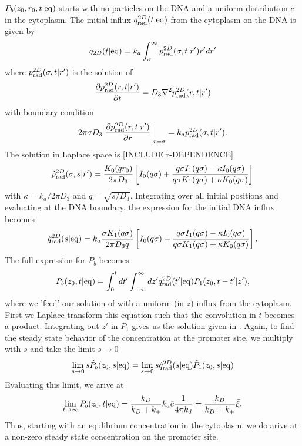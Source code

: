\documentclass[a4paper,10pt]{article}
\begin{document}
$P_b(z_0, r_0, t|{\rm eq})$ starts with no particles on the DNA and a uniform distribution $\bar{c}$ in the cytoplasm. The initial influx $q^{2D}_{\rm rad}(t|{\rm eq})$ from the cytoplasm on the DNA is given by 
\begin{equation}
 q_{2D}(t|{\rm eq}) = k_a \int_{\sigma}^{\infty} p^{2D}_{\rm rad}(\sigma,t|r') r' dr'
\end{equation}
where $p^{2D}_{\rm rad}(\sigma,t|r')$ is the solution of
\begin{equation}
 \frac{\partial p^{2D}_{\rm rad}(r,t|r')}{\partial t} = D_3 \nabla^2 p^{2D}_{\rm rad}(r,t|r') 
\end{equation}
with boundary condition
\begin{equation}
 2 \pi \sigma D_3 \left. \frac{\partial p^{2D}_{\rm rad}(r,t|r')}{\partial r} \right|_{r = \sigma} = k_a p^{2D}_{\rm rad}(\sigma,t|r').
\end{equation}
The solution in Laplace space is [INCLUDE r-DEPENDENCE]
\begin{equation}\hat{p}^{2D}_{\rm rad}(\sigma,s|r') = \frac{K_0(q r_0)}{2 \pi D_3}\left[ I_0(q \sigma) + \frac{q\sigma I_1(q\sigma) - \kappa I_0(q \sigma)}{q\sigma K_1(q\sigma) + \kappa K_0(q \sigma)} \right]
\end{equation}
with $\kappa = k_a / 2 \pi D_3$ and $q=\sqrt{s/D_3}$. Integrating over all initial positions and evaluating at the DNA boundary, the expression for the initial DNA influx becomes
\begin{equation}
 \hat{q}^{2D}_{\rm rad}(s|{\rm eq}) = k_a \frac{\sigma K_1(q \sigma)}{2 \pi D_3 q}\left[ I_0(q \sigma) + \frac{q\sigma I_1(q\sigma) - \kappa I_0(q \sigma)}{q\sigma K_1(q\sigma) + \kappa K_0(q \sigma)} \right].
\end{equation}
The full expression for $P_b$ becomes
\begin{equation}
 P_b(z_0,t|{\rm eq}) = \int_0^t dt' \int_{-\infty}^{\infty} dz' q^{2D}_{\rm rad}(t'|{\rm eq}) P_1(z_0,t-t'|z'),
\end{equation}
where we 'feed' our solution of  with a uniform (in $z$) influx from the cytoplasm. First we Laplace transform this equation such that the convolution in $t$  becomes a product. Integrating out $z'$ in $P_1$ gives us the solution given in . Again, to find the steady state behavior of the concentration at the promoter site, we multiply with $s$ and take the limit $s \to 0$
\begin{equation}
 \lim_{s \to 0} s \hat{P}_b(z_0,s|{\rm eq}) = \lim_{s \to 0} s \hat{q}^{2D}_{\rm rad} (s|{\rm eq}) \hat{P}_1(z_0,s|{\rm eq})
\end{equation}
Evaluating this limit, we arive at
\begin{equation}
 \lim_{t \to \infty} P_b(z_0,t|{\rm eq}) = \frac{k_D}{k_D + k_+} k_a \bar{c} \frac{1}{4 \pi k_d} = \frac{k_D}{k_D + k_+} \bar{\xi}.
\end{equation}
Thus, starting with an equlibrium concentration in the cytoplasm, we do arive at a non-zero steady state concentration on the promoter site.
\end{document}
